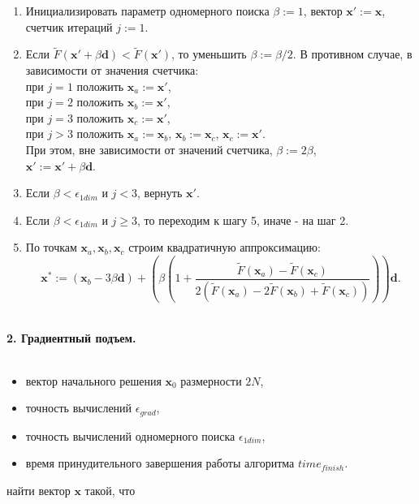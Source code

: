 \begin{enumerate}
  \item Инициализировать параметр одномерного поиска $\beta := 1$, вектор $\textbf{x}' := \textbf{x}$, счетчик итераций $j := 1$.
  \item Если $\tilde{F}(\textbf{x}' + \beta \textbf{d}) < \tilde{F}(\textbf{x}')$, то уменьшить $\beta := \beta / 2$.
  В противном случае, в зависимости от значения счетчика:\\
  при $j = 1$ положить $\textbf{x}_a := \textbf{x}'$,\\
  при $j = 2$ положить $\textbf{x}_b := \textbf{x}'$,\\
  при $j = 3$ положить $\textbf{x}_c := \textbf{x}'$,\\
  при $j > 3$ положить $\textbf{x}_a := \textbf{x}_b$, $\textbf{x}_b := \textbf{x}_c$, $\textbf{x}_c := \textbf{x}'$.\\
  При этом, вне зависимости от значений счетчика, $\beta := 2\beta$,\\
  $\textbf{x}' := \textbf{x}' + \beta \textbf{d}.$
  \item Если $\beta < \epsilon_{1dim}$ и $j < 3$, вернуть $\textbf{x}'$.
  \item Если $\beta < \epsilon_{1dim}$ и $j \geq 3$, то переходим к шагу 5, иначе - на шаг 2.
  \item По точкам $\textbf{x}_a, \textbf{x}_b, \textbf{x}_c$ строим квадратичную аппроксимацию:
   $$\textbf{x}^{*} := (\textbf{x}_b - 3 \beta \textbf{d}) +
   \left(\beta\left(1 + \frac{\tilde{F}(\textbf{x}_a) - \tilde{F}(\textbf{x}_c)}{2(\tilde{F}(\textbf{x}_a) -
   2\tilde{F}(\textbf{x}_b) + \tilde{F}(\textbf{x}_c))}\right)\right)\textbf{d}.$$\\
\end{enumerate}
{ \textbf{2. Градиентный подъем.}}
\\ \\
\begin{itemize}
  \item вектор начального решения $\textbf{x}_0$ размерности $2N$,
  \item точность вычислений $\epsilon_{grad}$,
  \item точность вычислений одномерного поиска $\epsilon_{1dim}$,
  \item время принудительного завершения работы алгоритма $time_{finish}.$\\
\end{itemize}
 найти вектор $\textbf{x}$ такой, что
